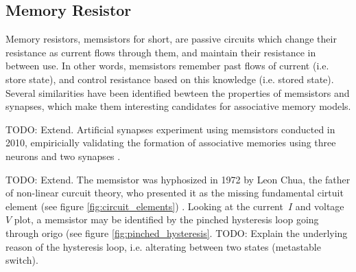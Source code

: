 \subsection{Memory Resistor}


Memory resistors, memsistors for short, are passive circuits which change their resistance as current flows through them, and maintain their resistance in between use. In other words, memsistors remember past flows of current (i.e. store state), and control resistance based on this knowledge (i.e. stored state). Several similarities have been identified bewteen the properties of memsistors and synapses, which make them interesting candidates for associative memory models.

TODO: Extend. Artificial synapses experiment using memsistors conducted in 2010, empiricially validating the formation of associative memories using three neurons and two synapses \cite{memristor_conditioning}.

TODO: Extend. The memsistor was hyphosized in 1972 by Leon Chua, the father of non-linear curcuit theory, who presented it as the missing fundamental cirtuit element (see figure \ref{fig:circuit_elements}) \cite{chua_memristor}. Looking at the current~$I$ and voltage~$V$ plot, a memsistor may be identified by the pinched hysteresis loop going through origo (see figure \ref{fig:pinched_hysteresis}. TODO: Explain the underlying reason of the hysteresis loop, i.e. alterating between two states (metastable switch).

%

